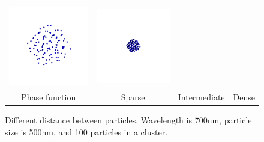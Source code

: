 \begin{figure}
\begin{tabular}{cccc}
        \includegraphics[width=\resLen]{images/particle/validate3_D2_N100_500nm.png} &
        \includegraphics[width=\resLen]{images/particle/validate4_D3_N100_500nm.png} 
        \\
        Phase function & Sparse & Intermediate & Dense
    \end{tabular}
    \caption{\label{fig:sparsity}
       Different distance between particles. Wavelength is 700nm, particle size is 500nm, and 100 particles in a cluster.
    }
\end{figure}

